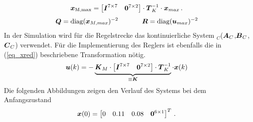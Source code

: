 \begin{equation}
\boldsymbol{x}_{\text{M,max}} = \begin{bmatrix}
\boldsymbol{I}^{7\times 7} & \boldsymbol{0}^{7\times 2}
\end{bmatrix}\cdot \boldsymbol{T}^{-1}_K \cdot \boldsymbol{x}_{max} \,.
\label{eq_xred}
\end{equation}
\begin{equation}
\boldsymbol{Q} = \text{diag}(\boldsymbol{x}_{M,max})^{-2} \hspace{35pt} \boldsymbol{R} = \text{diag}(\boldsymbol{u}_{max})^{-2}
\end{equation}
In der Simulation wird für die Regelstrecke das kontinuierliche System $_C$($\boldsymbol{A}_C$,$\boldsymbol{B}_C$,$\boldsymbol{C}_C$) verwendet. Für die Implementierung des Reglers ist ebenfalls die in (\ref{eq_xred}) beschriebene Transformation nötig.
\begin{equation}
\boldsymbol{u}(k) = -\underbrace{\boldsymbol{K}_M\cdot \begin{bmatrix}
\boldsymbol{I}^{7\times 7} & \boldsymbol{0}^{7\times 2}
\end{bmatrix} \cdot \boldsymbol{T}^{-1}_K}_{\equiv \boldsymbol{K}} \cdot \boldsymbol{x}(k)
\end{equation}
Die folgenden Abbildungen zeigen den Verlauf des Systems bei dem Anfangszustand
\begin{equation}
\boldsymbol{x}(0) = \begin{bmatrix}
0 & 0.11 & 0.08 & \boldsymbol{0}^{6\times 1}
\end{bmatrix}^T \,.
\end{equation}

